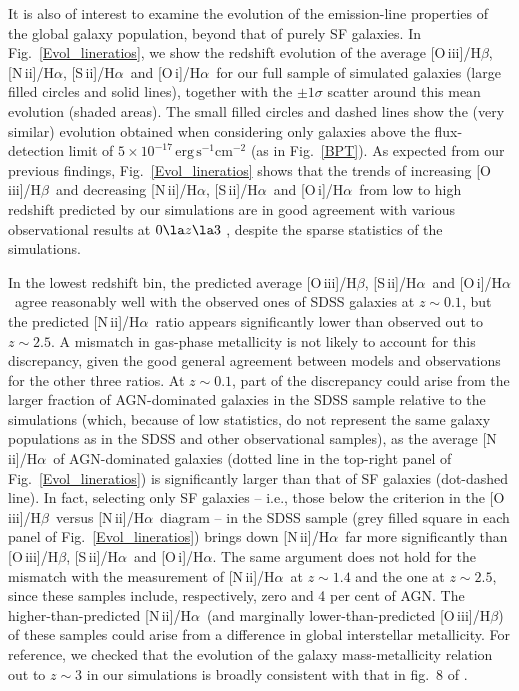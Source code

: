\documentclass[fleqn,usenatbib]{mnras}
\newcommand{\oiiihb}{\hbox{[O\,{\sc iii}]/H$\beta$}}
\newcommand{\niiha}{\hbox{[N\,{\sc ii}]/H$\alpha$}}
\newcommand{\siiha}{\hbox{[S\,{\sc ii}]/H$\alpha$}}
\newcommand{\oiha}{\hbox{[O\,{\sc i}]/H$\alpha$}}
\begin{document}
It is also of interest to examine the evolution of the emission-line
properties of the global  galaxy population, beyond that of purely SF
galaxies. In Fig.~\ref{Evol_lineratios}, we show  the redshift
evolution of the average \oiiihb, \niiha, \siiha\ and \oiha\ for our
full  sample of simulated galaxies (large filled circles and solid
lines), together with the $\pm1\sigma$  scatter around this mean
evolution (shaded areas). The small filled circles and dashed lines
show the (very similar) evolution obtained when considering only
galaxies above the flux-detection limit of $\mathrm{5\times
  10^{-17}\,erg\,s^{-1}cm^{-2}}$ (as in Fig.~\ref{BPT}). As expected
from our previous findings, Fig.~\ref{Evol_lineratios} shows that the
trends of increasing \oiiihb\ and decreasing \niiha, \siiha\ and
\oiha\ from low to high redshift predicted by our simulations are in
good  agreement with various observational results at $0\la z\la3$
\citep[from SDSS;][black symbols, as indicated in the top right panel]
{Yabe14,Steidel14,Steidel16,Vanzella16}, despite the sparse statistics
of the simulations.  

In the lowest redshift bin, the predicted average \oiiihb,
\siiha\ and \oiha\ agree reasonably well with the observed ones of
SDSS galaxies at $z\sim0.1$,  but the predicted \niiha\ ratio appears
significantly lower than observed out to $z\sim2.5$. A  mismatch in
gas-phase metallicity is not likely to account for this discrepancy,
given the good  general agreement between models and observations for
the other three ratios.  At $z\sim0.1$,  part of the discrepancy could
arise from the larger fraction of AGN-dominated galaxies  in the SDSS
sample relative to the simulations (which, because of low statistics, 
do not represent the same galaxy populations as in the SDSS and 
other observational samples), as the average \niiha\ of  AGN-dominated
galaxies (dotted line in the top-right panel of
Fig.~\ref{Evol_lineratios}) is  significantly larger than that  of  SF
galaxies (dot-dashed line). In fact, selecting only SF galaxies --
i.e., those below the \citet{Kauffmann03} criterion in the \oiiihb\
versus \niiha\ diagram -- in the SDSS sample (grey filled square in
each panel of Fig.~\ref{Evol_lineratios}) brings down \niiha\ far more
significantly than \oiiihb, \siiha\ and \oiha. The same argument does
not hold for the mismatch with the \citet{Yabe12} measurement of
\niiha\ at $z\sim1.4$ and the \citet{Steidel14} one at $z\sim2.5$,
since these samples include, respectively, zero and 4 per cent of
AGN. The higher-than-predicted \niiha\ (and marginally
lower-than-predicted \oiiihb)  of these samples could arise from a
difference in global interstellar metallicity. For reference, we
checked  that the evolution of the galaxy mass-metallicity relation
out to $z\sim3$ in our simulations is broadly  consistent with that in
fig.~8 of \citet{Maiolino08}.    
\end{document}
